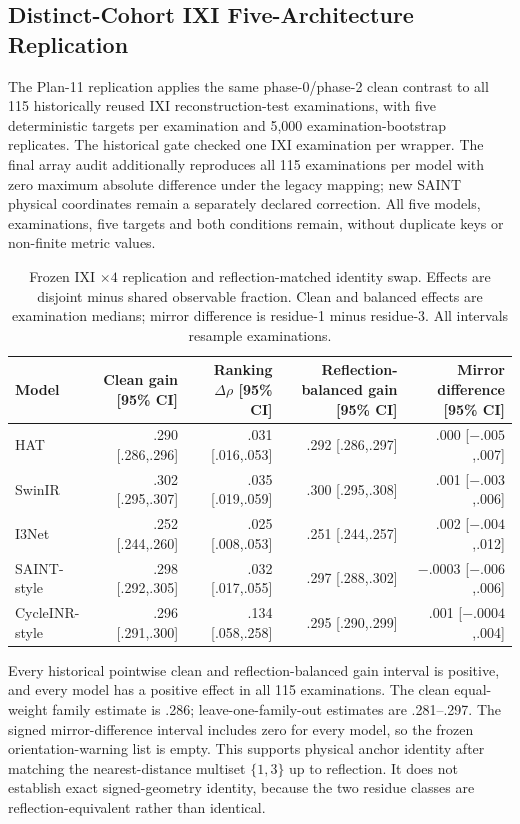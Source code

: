 \subsection{Distinct-Cohort IXI Five-Architecture Replication}
The Plan-11 replication applies the same phase-0/phase-2 clean contrast to all 115 historically reused IXI reconstruction-test examinations, with five deterministic targets per examination and 5,000 examination-bootstrap replicates. The historical gate checked one IXI examination per wrapper. The final array audit additionally reproduces all 115 examinations per model with zero maximum absolute difference under the legacy mapping; new SAINT physical coordinates remain a separately declared correction. All five models, examinations, five targets and both conditions remain, without duplicate keys or non-finite metric values.

\begin{table}[t]
\centering
\caption{Frozen IXI $\times4$ replication and reflection-matched identity swap. Effects are disjoint minus shared observable fraction. Clean and balanced effects are examination medians; mirror difference is residue-1 minus residue-3. All intervals resample examinations.}
\label{tab:p11-ixi-arch}
\setlength{\tabcolsep}{3.5pt}
\scriptsize
\begin{tabular}{lrrrr}
\toprule
Model & Clean gain [95\% CI] & Ranking $\Delta\rho$ [95\% CI] & Reflection-balanced gain [95\% CI] & Mirror difference [95\% CI] \\
\midrule
HAT & .290 [.286,.296] & .031 [.016,.053] & .292 [.286,.297] & .000 [$-.005$,.007] \\
SwinIR & .302 [.295,.307] & .035 [.019,.059] & .300 [.295,.308] & .001 [$-.003$,.006] \\
I3Net & .252 [.244,.260] & .025 [.008,.053] & .251 [.244,.257] & .002 [$-.004$,.012] \\
SAINT-style & .298 [.292,.305] & .032 [.017,.055] & .297 [.288,.302] & $-.0003$ [$-.006$,.006] \\
CycleINR-style & .296 [.291,.300] & .134 [.058,.258] & .295 [.290,.299] & .001 [$-.0004$,.004] \\
\bottomrule
\end{tabular}
\end{table}

Every historical pointwise clean and reflection-balanced gain interval is positive, and every model has a positive effect in all 115 examinations. The clean equal-weight family estimate is .286; leave-one-family-out estimates are .281--.297. The signed mirror-difference interval includes zero for every model, so the frozen orientation-warning list is empty. This supports physical anchor identity after matching the nearest-distance multiset $\{1,3\}$ up to reflection. It does not establish exact signed-geometry identity, because the two residue classes are reflection-equivalent rather than identical.

